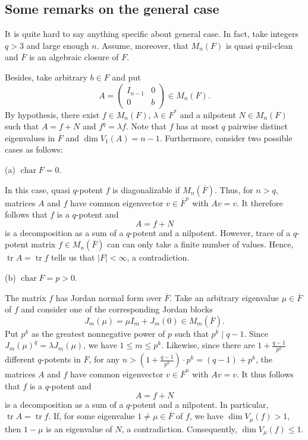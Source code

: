 \documentclass{amsart}
\DeclareMathOperator{\Char}{char}
\DeclareMathOperator{\tr}{tr}
\theoremstyle{definition}
\theoremstyle{remark}
\numberwithin{equation}{section}
\begin{document}
\subsection{Some remarks on the general case}

It is quite hard to say anything specific about general case. In fact, take integers $q > 3$ and large enough $n$. Assume, moreover, that $M_{n}(F)$ is quasi $q$-nil-clean and $\overline{F}$ is an algebraic closure of $F$.

Besides, take arbitrary $b \in F$ and put
\[
  A =
  \left(
  \begin{array}{c|c}
    I_{n-1} & 0
    \\
    \hline
    0 & b
  \end{array}
  \right) \in M_{n}(F).
\]
By hypothesis, there exist $f \in M_{n}(F)$, $\lambda \in F^{*}$ and a nilpotent $N \in M_{n}(F)$ such that
$A = f + N$ and $f^{q} = \lambda f$. Note that $f$ has at most $q$ pairwise distinct eigenvalues in $\overline{F}$ and $\dim V_{1}(A) = n-1$. Furthermore, consider two possible cases as follows:

\medskip

(a) $\Char F  = 0$.

\medskip

In this case, quasi $q$-potent $f$ is diagonalizable if $M_{n}(\overline{F})$. Thus, for $n > q$, matrices $A$ and $f$ have common eigenvector $v \in \overline{F}^{n}$ with $Av = v$. It therefore follows that $f$ is a $q$-potent and
\[
  A = f + N
\]
is a decomposition as a sum of a $q$-potent and a nilpotent. However, trace of a $q$-potent matrix $f \in M_{n}(\overline{F})$ can can only take a finite number of values. Hence, $\tr A = \tr f$ tells us that $|F| < \infty$, a contradiction.

\medskip

(b) $\Char F = p>0$.

\medskip

The matrix $f$ has Jordan normal form over $\overline{F}$. Take an arbitrary eigenvalue $\mu \in \overline{F}$ of $f$ and consider one of the corresponding Jordan blocks $$J_{m}(\mu) = \mu I_{m} + J_{m}(0) \in M_{m}(\overline{F}).$$ Put $p^{k}$ as the greatest nonnegative power of $p$ such that $p^{k} \mid q-1$. Since $J_{m}(\mu)^{q} = \lambda J_{m}(\mu)$, we have $1 \leq m \leq p^{k}$. Likewise, since there are $1+\frac{q-1}{p^k}$ different $q$-potents in $\overline{F}$, for any $n > (1+\frac{q-1}{p^k}) \cdot p^k = (q-1) + p^k$, the matrices $A$ and $f$ have common eigenvector $v \in \overline{F}^{n}$ with $Av = v$. It thus follows that $f$ is a $q$-potent and
\[
  A = f + N
\]
is a decomposition as a sum of a $q$-potent and a nilpotent. In particular, $\tr A = \tr f$. If, for some eigenvalue $1 \not = \mu \in \overline{F}$ of $f$, we have $\dim V_{\mu}(f) > 1$, then $1-\mu$ is an eigenvalue of $N$, a contradiction. Consequently, $\dim V_{\mu}(f) \leq 1$.
\end{document}
